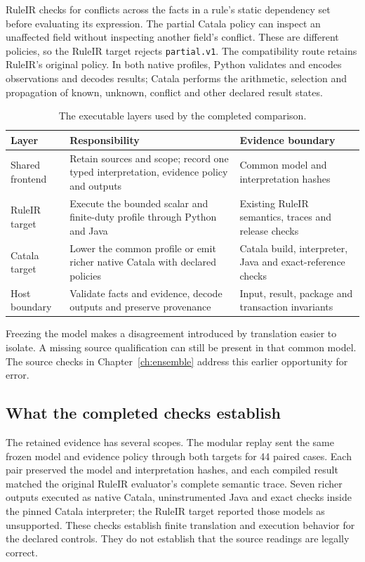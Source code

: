 \documentclass[12pt,a4paper,oneside,openany]{book}
\begin{document}
RuleIR checks for conflicts across the facts in a rule's static dependency set
before evaluating its expression. The partial Catala policy can inspect an
unaffected field without inspecting another field's conflict. These are different
policies, so the RuleIR target rejects \texttt{partial.v1}. The compatibility
route retains RuleIR's original policy. In both native profiles, Python
validates and encodes observations and decodes results; Catala performs the
arithmetic, selection and propagation of known, unknown, conflict and other
declared result states.

\begin{table}[htbp]
\centering
\caption{The executable layers used by the completed comparison.}
\label{tab:shared-executable-layers}
\begin{tabularx}{\textwidth}{P{34mm}YY}
\toprule
Layer & Responsibility & Evidence boundary\\
\midrule
Shared frontend & Retain sources and scope; record one typed interpretation, evidence policy and outputs & Common model and interpretation hashes\\
\addlinespace[0.4em]
RuleIR target & Execute the bounded scalar and finite-duty profile through Python and Java & Existing RuleIR semantics, traces and release checks\\
\addlinespace[0.4em]
Catala target & Lower the common profile or emit richer native Catala with declared policies & Catala build, interpreter, Java and exact-reference checks\\
\addlinespace[0.4em]
Host boundary & Validate facts and evidence, decode outputs and preserve provenance & Input, result, package and transaction invariants\\
\bottomrule
\end{tabularx}
\end{table}

Freezing the model makes a disagreement introduced by translation easier to
isolate. A missing source qualification can still be present in that common
model. The source checks in Chapter~\ref{ch:ensemble} address this earlier
opportunity for error.

\subsection{What the completed checks establish}
\label{sec:implementation-catala-evidence}

The retained evidence has several scopes. The modular replay sent the same
frozen model and evidence policy through both targets for 44 paired cases. Each
pair preserved the model and interpretation hashes, and each compiled result
matched the original RuleIR evaluator's complete semantic trace. Seven richer
outputs executed as native Catala, uninstrumented Java and exact checks inside
the pinned Catala interpreter; the RuleIR target reported those models as
unsupported. These checks establish finite translation and execution behavior
for the declared controls. They do not establish that the source readings are
legally correct.
\end{document}
